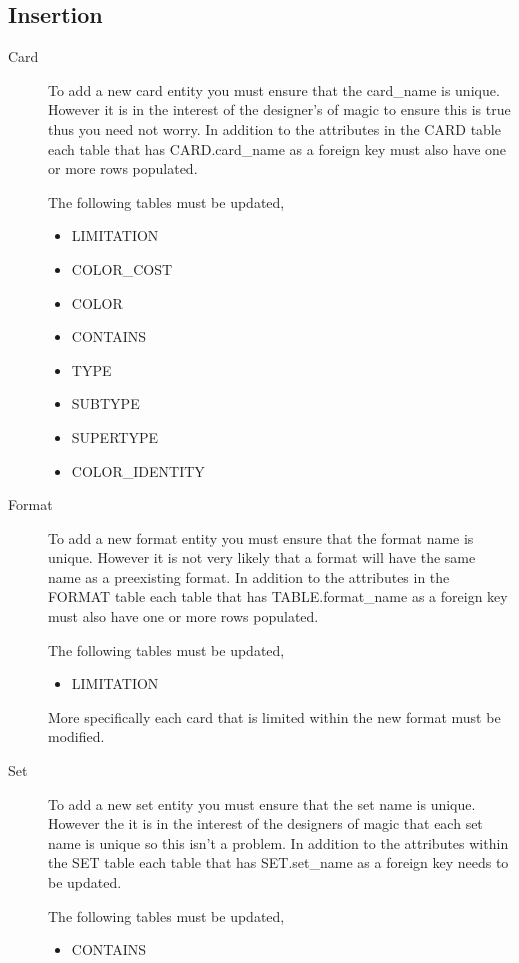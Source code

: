\documentclass{article}
\begin{document}
\subsection{Insertion}
\begin{description}
    \item[Card]
        To add a new card entity you must ensure that the card\_name is unique.
        However it is in the interest of the designer's of magic to ensure this is true thus you need not worry.
        In addition to the attributes in the CARD table each table that has CARD.card\_name as a foreign key must also have one or more rows populated.

        The following tables must be updated,
        \begin{multicols}{3}
            \begin{itemize}
                \item LIMITATION
                \item COLOR\_COST
                \item COLOR
                \item CONTAINS
                \item TYPE
                \item SUBTYPE
                \item SUPERTYPE
                \item COLOR\_IDENTITY
            \end{itemize}
        \end{multicols}
    \item[Format]
        To add a new format entity you must ensure that the format name is unique.
        However it is not very likely that a format will have the same name as a preexisting format.
        In addition to the attributes in the FORMAT table each table that has TABLE.format\_name as a foreign key must also have one or more rows populated.

        The following tables must be updated,
        \begin{multicols}{3}
            \begin{itemize}
                \item LIMITATION
            \end{itemize}
        \end{multicols}
        More specifically each card that is limited within the new format must be modified.
    \item[Set]
        To add a new set entity you must ensure that the set name is unique.
        However the it is in the interest of the designers of magic that each set name is unique so this isn't a problem.
        In addition to the attributes within the SET table each table that has SET.set\_name as a foreign key needs to be updated.

        The following tables must be updated,
        \begin{multicols}{3}
            \begin{itemize}
                \item CONTAINS
            \end{itemize}
        \end{multicols}
\end{description}
\end{document}
